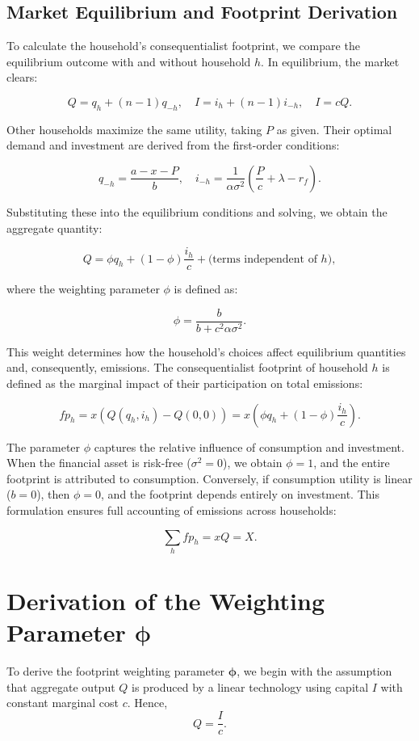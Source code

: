 \documentclass[12pt,a4paper]{article}%
\begin{document}
\subsection*{Market Equilibrium and Footprint Derivation}

To calculate the household's consequentialist footprint, we compare the equilibrium outcome with and without household $h$. In equilibrium, the market clears:

\[
Q = q_h + (n - 1) q_{-h}, \quad I = i_h + (n - 1) i_{-h}, \quad I = cQ.
\]

Other households maximize the same utility, taking $P$ as given. Their optimal demand and investment are derived from the first-order conditions:

\[
q_{-h} = \frac{a - x - P}{b}, \quad i_{-h} = \frac{1}{\alpha \sigma^2} \left( \frac{P}{c} + \lambda - r_f \right).
\]

Substituting these into the equilibrium conditions and solving, we obtain the aggregate quantity:

\[
Q = \phi q_h + (1 - \phi) \frac{i_h}{c} + \text{(terms independent of } h),
\]

where the weighting parameter $\phi$ is defined as:

\[
\phi = \frac{b}{b + c^2 \alpha \sigma^2}.
\]

This weight determines how the household’s choices affect equilibrium quantities and, consequently, emissions. The consequentialist footprint of household $h$ is defined as the marginal impact of their participation on total emissions:

\[
fp_h = x \left( Q(q_h, i_h) - Q(0, 0) \right) = x \left( \phi q_h + (1 - \phi) \frac{i_h}{c} \right).
\]


The parameter $\phi$ captures the relative influence of consumption and investment. When the financial asset is risk-free ($\sigma^2 = 0$), we obtain $\phi = 1$, and the entire footprint is attributed to consumption. Conversely, if consumption utility is linear ($b = 0$), then $\phi = 0$, and the footprint depends entirely on investment. This formulation ensures full accounting of emissions across households:

\[
\sum_h fp_h = xQ = X.
\]
\section{Derivation of the Weighting Parameter \( \boldsymbol{\phi} \)}

To derive the footprint weighting parameter \( \boldsymbol{\phi} \), we begin with the assumption that aggregate output \( Q \) is produced by a linear technology using capital \( I \) with constant marginal cost \( c \). Hence,
\[
Q = \frac{I}{c}.
\]
\end{document}
